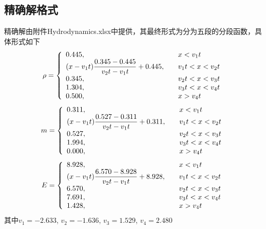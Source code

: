 \documentclass[10.5pt
]{article}
\begin{document}
\subsection{精确解格式}
精确解由附件Hydrodynamics.xlsx中提供，其最终形式为分为五段的分段函数，具体形式如下
\begin{align}
\rho = \left\{ \begin{array}{ll}
0.445, & \quad x < v_1 t \\
\qty(x-v_1 t)\dfrac{0.345 - 0.445}{v_2 t - v_1 t} + 0.445, & \quad v_1 t < x < v_2 t \\
0.345, & \quad v_2 t< x < v_3 t \\
1.304, & \quad v_3 t< x < v_4 t \\
0.500, & \quad x > v_4 t
\end{array} \right.
\end{align}
\begin{align}
m = \left\{ \begin{array}{ll}
0.311, & \quad x < v_1 t \\
\qty(x-v_1 t)\dfrac{0.527 - 0.311}{v_2 t - v_1 t} + 0.311, & \quad v_1 t < x < v_2 t \\
0.527, & \quad v_2 t< x < v_3 t \\
1.994, & \quad v_3 t< x < v_4 t \\
0.000, & \quad x > v_4 t
\end{array} \right.
\end{align}
\begin{align}
E = \left\{ \begin{array}{ll}
8.928, & \quad x < v_1 t \\
\qty(x-v_1 t)\dfrac{6.570 - 8.928}{v_2 t - v_1 t} + 8.928, & \quad v_1 t < x < v_2 t \\
6.570, & \quad v_2 t< x < v_3 t \\
7.691, & \quad v_3 t< x < v_4 t \\
1.428, & \quad x > v_4 t
\end{array} \right.
\end{align}
其中$v_1 = -2.633$, $v_2 = -1.636$, $v_3 = 1.529$, $v_4 = 2.480$
\end{document}
